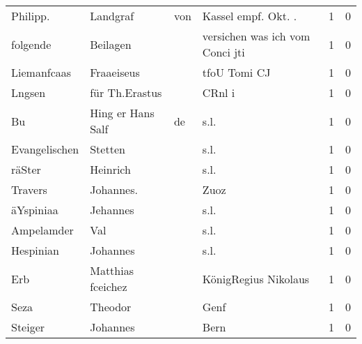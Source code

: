 \begin{center}
\begin{tiny}
\begin{longtabu}{llllrr}
                 Philipp. &                           Landgraf &         von &                        Kassel empf. Okt. .  &          1 &         0 \\
                 folgende &                           Beilagen &             &             versichen was ich vom Conci jti &          1 &         0 \\
              Liemanfcaas &                         Fraaeiseus &             &                                tfoU Tomi CJ &          1 &         0 \\
                   Lngsen &                     für Th.Erastus &             &                                      CRnl i &          1 &         0 \\
                       Bu &                  Hing er Hans Salf &          de &                                        s.l. &          1 &         0 \\
            Evangelischen &                            Stetten &             &                                        s.l. &          1 &         0 \\
                   räSter &                           Heinrich &             &                                        s.l. &          1 &         0 \\
                  Travers &                          Johannes. &             &                                        Zuoz &          1 &         0 \\
                äYspiniaa &                           Jehannes &             &                                        s.l. &          1 &         0 \\
               Ampelamder &                                Val &             &                                        s.l. &          1 &         0 \\
                Hespinian &                           Johannes &             &                                        s.l. &          1 &         0 \\
                      Erb &                  Matthias fceichez &             &                        KönigRegius Nikolaus &          1 &         0 \\
                     Seza &                            Theodor &             &                                        Genf &          1 &         0 \\
                  Steiger &                           Johannes &             &                                        Bern &          1 &         0 \\

\end{longtabu}
\end{tiny}
\end{center}
